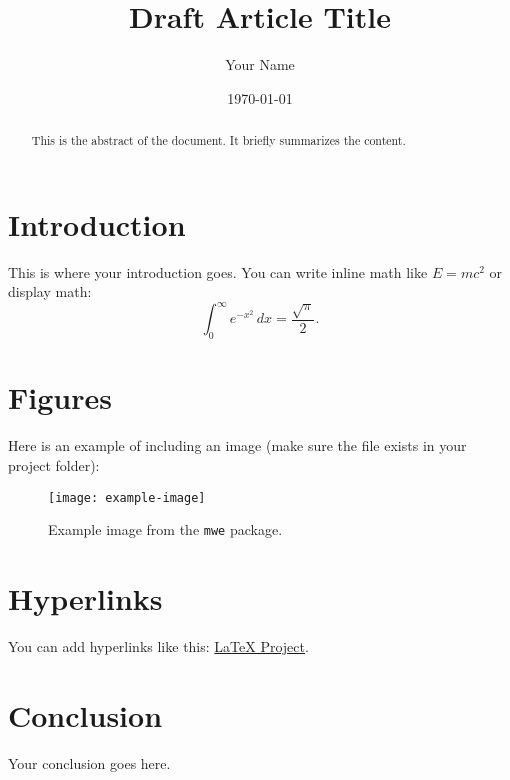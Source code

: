 \documentclass[12pt,a4paper]{article}
\title{Draft Article Title}
\author{Your Name}
\date{\today}
\begin{document}
\maketitle

\begin{abstract}
This is the abstract of the document. It briefly summarizes the content.
\end{abstract}

\section{Introduction}
This is where your introduction goes. You can write inline math like
\( E = mc^2 \) or display math:
\[
\int_{0}^{\infty} e^{-x^2} \, dx = \frac{\sqrt{\pi}}{2}.
\]

\section{Figures}
Here is an example of including an image (make sure the file exists in your project folder):

\begin{figure}[H]
    \centering
    \texttt{[image: example-image]}
    \caption{Example image from the \texttt{mwe} package.}
    \label{fig:example}
\end{figure}

\section{Hyperlinks}
You can add hyperlinks like this: \href{https://www.latex-project.org}{LaTeX Project}.

\section{Conclusion}
Your conclusion goes here.


\end{document}
